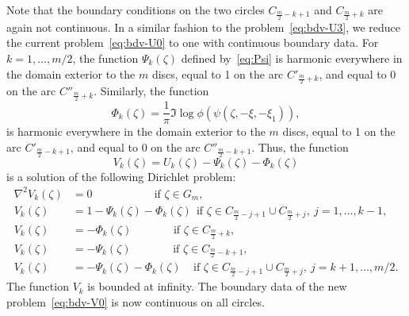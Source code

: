 Note that the boundary conditions on the two circles $C_{\frac{m}{2}-k+1}$ and $C_{\frac{m}{2}+k}$ are again not continuous. In a similar fashion to the problem~\eqref{eq:bdv-U3}, we reduce the current problem~\eqref{eq:bdv-U0} to one with continuous boundary data. 
For $k=1,\ldots,m/2$, the function $\Psi_k(\zeta)$ defined by~\eqref{eq:Psi} is harmonic everywhere in the domain exterior to the $m$ discs, equal to 1 on the arc $C'_{\frac{m}{2}+k}$, and equal to $0$ on the arc $C''_{\frac{m}{2}+k}$.
Similarly, the function 
\begin{equation}\label{eq:Phi_k}
\Phi_k(\zeta)=\frac{1}{\pi}\Im \log \phi(\psi(\zeta,-\xi,-\xi_1)), 
\end{equation}
is harmonic everywhere in the domain exterior to the $m$ discs, equal to 1 on the arc $C'_{\frac{m}{2}-k+1}$, and equal to $0$ on the arc $C''_{\frac{m}{2}-k+1}$.
Thus, the function 
\begin{equation}\label{eq:Vk-Uk-0}
V_k(\zeta)=U_k(\zeta)-\Psi_k(\zeta)-\Phi_k(\zeta)
\end{equation}
is a solution of the following Dirichlet problem:
\begin{subequations}\label{eq:bdv-V0}
	\begin{align}
	\label{eq:V-Lap}
	\nabla^2 V_k(\zeta) &= 0 ~~~~~~~~~~~~~~~~~~~~~~~\:\; \mbox{if }\zeta\in G_m, \\
	\label{eq:V-m}
	V_k(\zeta)&= 1-\Psi_k(\zeta)-\Phi_k(\zeta) ~~ \mbox{if }\zeta\in C_{\frac{m}{2}-j+1}\cup C_{\frac{m}{2}+j}, ~ j=1,\ldots,k-1, \\
	\label{eq:V-k'}
	V_k(\zeta)&= -\Phi_k(\zeta) ~~~~~~~~~~~~~~~\:\: \mbox{if }\zeta\in C_{\frac{m}{2}+k},  \\
	\label{eq:V-k''}
	V_k(\zeta)&= -\Psi_k(\zeta) ~~~~~~~~~~~~~~~\:\: \mbox{if }\zeta\in C_{\frac{m}{2}-k+1},  \\
	\label{eq:V-p}
	V_k(\zeta)&= -\Psi_k(\zeta)-\Phi_k(\zeta)  ~~~~~ \mbox{if }\zeta\in C_{\frac{m}{2}-j+1}\cup C_{\frac{m}{2}+j}, ~ j=k+1,\ldots,m/2. 
	\end{align}
\end{subequations}
The function $V_k$ is bounded at infinity.
The boundary data of the new problem~\eqref{eq:bdv-V0} is now continuous on all circles. 

